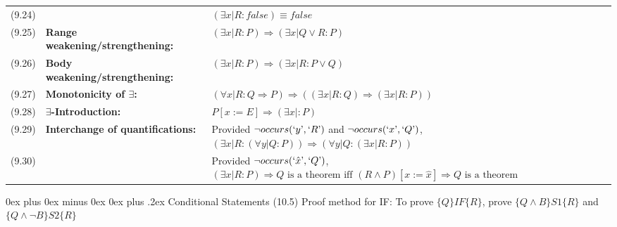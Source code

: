 \documentclass[letterpaper, 8pt]{extarticle}
\makeatletter
\renewcommand{\subsection}{\@startsection{subsection}{2}{0mm}%
                                {0ex plus 0ex minus 0ex}%
                                {0ex plus .2ex}%
                                {\normalfont\small\bfseries}}
\newcommand{\To}{\Rightarrow}
\makeatother
\begin{document}
\begin{multicols*}{3}
\begin{tabulary}{\linewidth}{@{}lLL@{}}
        (9.24) &                                                    & $(\exists x | R : false) \equiv false$                                                                                                                                     \\
        (9.25) & \textbf{Range weakening/strengthening:}            & $(\exists x | R : P) \To (\exists x | Q \lor R : P)$                                                                                                                       \\
        (9.26) & \textbf{Body weakening/strengthening:}             & $(\exists x | R : P) \To (\exists x | R : P \lor Q)$                                                                                                                       \\
        (9.27) & \textbf{Monotonicity of $\exists$:}                & $(\forall x | R : Q \To P) \To ((\exists x | R : Q) \To (\exists x | R : P ))$                                                                                             \\
        (9.28) & \textbf{$\exists$-Introduction:}                   & $P[x := E] \To (\exists x |: P)$                                                                                                                                           \\
        (9.29) & \textbf{Interchange of quantifications:}           & Provided $\neg occurs(`y\textrm', `R\textrm')$ and $\neg occurs(`x\textrm', `Q\textrm')$, $(\exists x | R: (\forall y | Q : P)) \To (\forall y | Q : (\exists x | R : P))$ \\
        (9.30) &                                                    & Provided $\neg occurs(`\hat{x}\textrm', `Q\textrm')$, $(\exists x | R : P) \To Q \text{ is a theorem iff } (R \land P)[x := \hat{x}] \To Q \text{ is a theorem}$           \\
    \end{tabulary}

    \subsection{Conditional Statements}
    (10.5) Proof method for IF: To prove $\{Q\} IF \{R\}$, prove $\{Q \land B\} S1 \{R\}$ and $\{Q \land \neg B\} S2 \{R\}$




\end{multicols*}
\end{document}
